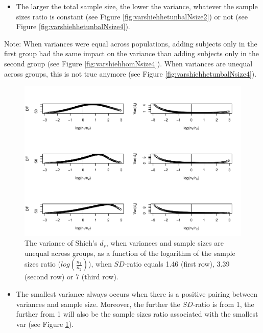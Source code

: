 \documentclass[
  man]{apa6}
\providecommand{\tightlist}{%
  \setlength{\itemsep}{0pt}\setlength{\parskip}{0pt}}
\begin{document}
\begin{itemize}
\tightlist
\item
  The larger the total sample size, the lower the variance, whatever the sample sizes ratio is constant (see Figure \ref{fig:varshiehhetunbalNsize2}) or not (see Figure \ref{fig:varshiehhetunbalNsize4}).
\end{itemize}

Note: When variances were equal across populations, adding subjects only in the first group had the same impact on the variance than adding subjects only in the second group (see Figure \ref{fig:varshiehhomNsize4}). When variances are unequal across groups, this is not true anymore (see Figure \ref{fig:varshiehhetunbalNsize4}).

\begin{figure}
\centering
\includegraphics{Theoretical-Variance-of-all-estimators-as-a-function-of-population-parameters_files/figure-latex/varshiehhetunbaldfandvar-1.pdf}
\caption{\label{fig:varshiehhetunbaldfandvar}The variance of Shieh's \(d_s\), when variances and sample sizes are unequal across groups, as a function of the logarithm of the sample sizes ratio (\(log \left( \frac{n_1}{n_2} \right)\)), when \(SD\)-ratio equals 1.46 (first row), 3.39 (second row) or 7 (third row).}
\end{figure}

\begin{itemize}
\tightlist
\item
  The smallest variance always occurs when there is a positive pairing between variances and sample size. Moreover, the further the \(SD\)-ratio is from 1, the further from 1 will also be the sample sizes ratio associated with the smallest var (see Figure \ref{fig:varshiehhetunbaldfandvar}).
\end{itemize}
\end{document}
